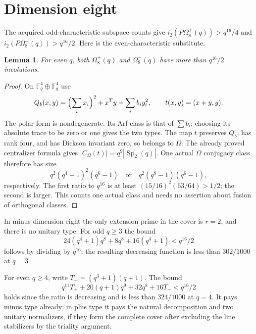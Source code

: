 \documentclass[11pt,a4paper]{article}
\newtheorem{lemma}{Lemma}\newtheorem{proposition}[lemma]{Proposition}
\newcommand{\F}{\mathbb F}\newcommand{\Om}{\Omega}
\newcommand{\Sp}{\operatorname{Sp}}\newcommand{\Aut}{\operatorname{Aut}}
\begin{document}
\section{Dimension eight}
The acquired odd-characteristic subspace counts give
$i_2(P\Om^+_8(q))>q^{16}/4$ and
$i_2(P\Om^-_8(q))>q^{16}/2$.
Here is the even-characteristic substitute.

\begin{lemma}\label{evenlower}
For even $q$, both $\Om^+_8(q)$ and $\Om^-_8(q)$ have more than
$q^{16}/2$ involutions.
\end{lemma}
\begin{proof}
On $\F_q^4\oplus\F_q^4$ use
\[
 Q_b(x,y)=\Bigl(\sum_i x_i\Bigr)^2+x^Ty+\sum_i b_i y_i^2,
 \qquad t(x,y)=(x+y,y).
\]
The polar form is nondegenerate. Its Arf class is that of $\sum b_i$;
choosing its absolute trace to be zero or one gives the two types.
The map $t$ preserves $Q_b$, has rank four, and has Dickson invariant
zero, so belongs to $\Om$. The already proved centralizer formula
gives $|C_{\Om}(t)|=q^9|\Sp_2(q)|$. One actual $\Om$ conjugacy
class therefore has size
\[
 q^2(q^4-1)^2(q^6-1)\quad\text{or}\quad
 q^2(q^8-1)(q^6-1),
\]
respectively. The first ratio to $q^{16}$ is at least
$(15/16)^2(63/64)>1/2$; the second is larger. This counts one
actual class and needs no assertion about fusion of orthogonal classes.
\end{proof}

In minus dimension eight the only extension prime in the cover is
$r=2$, and there is no unitary type. For odd $q\ge3$ the bound
\begin{equation}\label{minusEight}
 24(q^4+1)q^8+8q^8+16(q^4+1)<q^{16}/2
\end{equation}
follows by dividing by $q^{16}$: the resulting decreasing function
is less than $302/1000$ at $q=3$.

For even $q\ge4$, write $T_+=(q^3+1)(q+1)$. The bound
\begin{equation}\label{evenEight}
 q^{11}T_++20(q+1)q^9+32q^8+16T_+<q^{16}/2
\end{equation}
holds since the ratio is decreasing and is less than $324/1000$ at
$q=4$. It pays minus type already; in plus type it pays the natural
decomposition and two unitary normalizers, if they form the complete
cover after excluding the line stabilizers by the triality argument.
\end{document}
